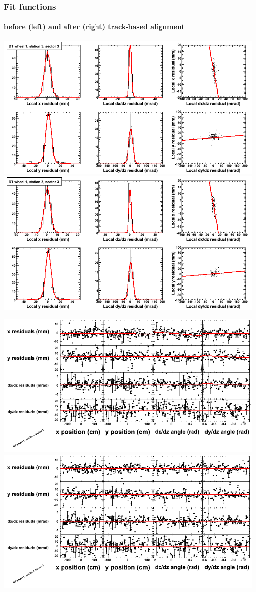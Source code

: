 \documentclass[compress]{beamer}
\begin{document}
\begin{frame}
\frametitle{Fit functions}
\framesubtitle{before (left) and after (right) track-based alignment}
\includegraphics[width=0.5\linewidth]{fitfunctions_re01/MBwhDst3sec03_bellcurves.png} \includegraphics[width=0.5\linewidth]{fitfunctions_re05/MBwhDst3sec03_bellcurves.png}

\includegraphics[width=0.5\linewidth]{fitfunctions_re01/MBwhDst3sec03_polynomials.png} \includegraphics[width=0.5\linewidth]{fitfunctions_re05/MBwhDst3sec03_polynomials.png}
\end{frame}
\end{document}
